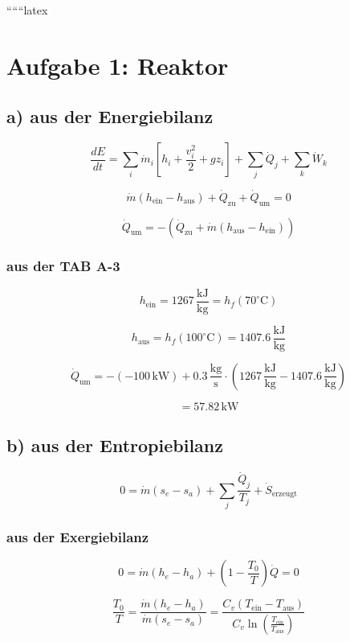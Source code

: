 
``````latex


\section*{Aufgabe 1: Reaktor}

\subsection*{a) aus der Energiebilanz}

\[
\frac{dE}{dt} = \sum_i \dot{m}_i \left[ h_i + \frac{v_i^2}{2} + g z_i \right] + \sum_j \dot{Q}_j + \sum_k \dot{W}_k
\]

\[
\dot{m} (h_{\text{ein}} - h_{\text{aus}}) + \dot{Q}_{\text{zu}} + \dot{Q}_{\text{um}} = 0
\]

\[
\dot{Q}_{\text{um}} = -(\dot{Q}_{\text{zu}} + \dot{m} (h_{\text{aus}} - h_{\text{ein}}))
\]

\subsubsection*{aus der TAB A-3}

\[
h_{\text{ein}} = 1267 \, \frac{\text{kJ}}{\text{kg}} = h_f (70^\circ \text{C})
\]

\[
h_{\text{aus}} = h_f (100^\circ \text{C}) = 1407.6 \, \frac{\text{kJ}}{\text{kg}}
\]

\[
\dot{Q}_{\text{um}} = -(-100 \, \text{kW}) + 0.3 \, \frac{\text{kg}}{\text{s}} \cdot (1267 \, \frac{\text{kJ}}{\text{kg}} - 1407.6 \, \frac{\text{kJ}}{\text{kg}})
\]

\[
= 57.82 \, \text{kW}
\]

\subsection*{b) aus der Entropiebilanz}

\[
0 = \dot{m} (s_e - s_a) + \sum_j \frac{\dot{Q}_j}{T_j} + \dot{S}_{\text{erzeugt}}
\]

\subsubsection*{aus der Exergiebilanz}

\[
0 = \dot{m} (h_e - h_a) + \left( 1 - \frac{T_0}{T} \right) \dot{Q} = 0
\]

\[
\frac{T_0}{T} = \frac{\dot{m} (h_e - h_a)}{\dot{m} (s_e - s_a)} = \frac{C_v (T_{\text{ein}} - T_{\text{aus}})}{C_v \ln \left( \frac{T_{\text{ein}}}{T_{\text{aus}}} \right)}
\]

